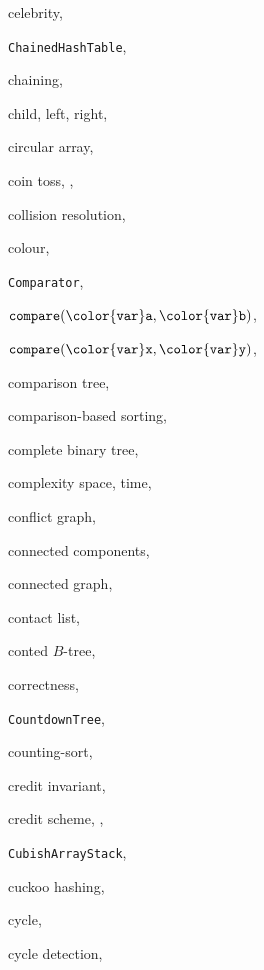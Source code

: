 \documentclass[10pt]{book}
\theoremstyle{plain}
\theoremstyle{definition}
\begin{document}
\begin{theindex}
  \indexspace

  \item celebrity, 
  \item \texttt{ChainedHashTable}, 
  \item chaining, 
  \item child, 
    \subitem left, 
    \subitem right, 
  \item circular array, 
  \item coin toss, , 
  \item collision resolution, 
  \item colour, 
  \item \texttt  {Comparator}, 
  \item \ensuremath  {\mathtt  {compare({\color  {var}a},{\color  {var}b})}}, 
  \item \ensuremath{\mathtt{compare({\color{var}x},{\color{var}y})}}, 
  \item comparison tree, 
  \item comparison-based sorting, 
  \item complete binary tree, 
  \item complexity
    \subitem space, 
    \subitem time, 
  \item conflict graph, 
  \item connected components, 
  \item connected graph, 
  \item contact list, 
  \item conted $B$-tree, 
  \item correctness, 
  \item \texttt{CountdownTree}, 
  \item counting-sort, 
  \item credit invariant, 
  \item credit scheme, , 
  \item \texttt{CubishArrayStack}, 
  \item cuckoo hashing, 
  \item cycle, 
  \item cycle detection, 


\end{theindex}
\end{document}

